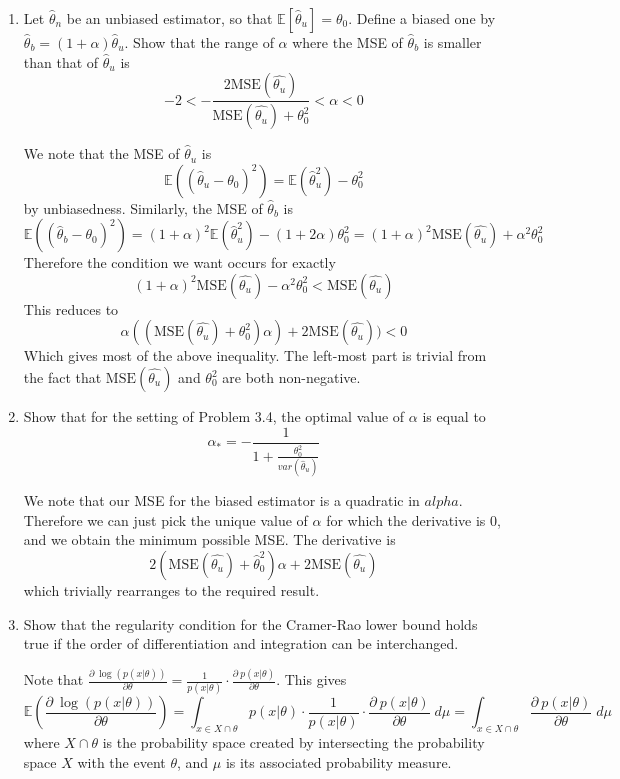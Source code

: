 \documentclass{article}
\newcommand{\chapternumber}{3}
\newenvironment{QandA}{\begin{enumerate}[label=\chapternumber.\arabic*]\bfseries\boldmath}
	{\end{enumerate}}
\newenvironment{answered}{\par\bigskip\normalfont\unboldmath}{}
\begin{document}
\begin{QandA}
		\item Let $\hat{\theta}_n$ be an unbiased estimator, so that $\mathbb{E}[\hat{\theta}_u]=\theta_0$. Define a biased one by $\hat{\theta}_b=(1+\alpha)\hat{\theta}_u$. Show that the range of $\alpha$ where the MSE of $\hat{\theta}_b$ is smaller than that of $\hat{\theta}_u$ is
		\[-2<-\frac{2\text{MSE}(\hat{\theta_u})}{\text{MSE}(\hat{\theta_u})+\theta_0^2}<\alpha<0\]
		\begin{answered}
			We note that the MSE of $\hat{\theta}_u$ is 
			\[\mathbb{E}((\hat{\theta}_u-\theta_0)^2)=\mathbb{E}(\hat{\theta}_u^2)-\theta_0^2\]
			by unbiasedness. Similarly, the MSE of $\hat{\theta}_b$ is
			\[\mathbb{E}((\hat{\theta}_b-\theta_0)^2)=(1+\alpha)^2\mathbb{E}(\hat{\theta}_u^2)-(1+2\alpha)\theta_0^2=(1+\alpha)^2\text{MSE}(\hat{\theta_u})+\alpha^2\theta_0^2\]
			Therefore the condition we want occurs for exactly
			\[(1+\alpha)^2\text{MSE}(\hat{\theta_u})-\alpha^2\theta_0^2<\text{MSE}(\hat{\theta_u})\]
			This reduces to
			\[\alpha((\text{MSE}(\hat{\theta_u})+\theta_0^2)\alpha)+2\text{MSE}(\hat{\theta_u}))<0\]
			Which gives most of the above inequality. The left-most part is trivial from the fact that $\text{MSE}(\hat{\theta_u})$ and $\theta_0^2$ are both non-negative.
		\end{answered}
	
		\item Show that for the setting of Problem 3.4, the optimal value of $\alpha$ is equal to 
		\[\alpha_*=-\frac{1}{1+\frac{\theta_0^2}{var(\hat{\theta}_u)}}\]
		\begin{answered}
			We note that our MSE for the biased estimator is a quadratic in $alpha$. Therefore we can just pick the unique value of $\alpha$ for which the derivative is 0, and we obtain the minimum possible MSE. The derivative is
			\[2(\text{MSE}(\hat{\theta_u})+\hat{\theta}_0^2)\alpha+2\text{MSE}(\hat{\theta_u})\]
			which trivially rearranges to the required result.
		\end{answered}
	
		\item Show that the regularity condition for the Cramer-Rao lower bound holds true if the order of differentiation and integration can be interchanged.
		\begin{answered}
			Note that $\frac{\partial\:\log (p(x|\theta))}{\partial \theta} = \frac{1}{p(x|\theta)}\cdot\frac{\partial\:p(x|\theta)}{\partial \theta}$. This gives \[\mathbb{E}\left(\frac{\partial\:\log (p(x|\theta))}{\partial \theta}\right)=\int_{x\in X\cap\theta} p(x|\theta)\cdot\frac{1}{p(x|\theta)}\cdot\frac{\partial\:p(x|\theta)}{\partial \theta}\;d\mu=\int_{x\in X\cap\theta}\frac{\partial\:p(x|\theta)}{\partial \theta}\;d\mu\]
			where $X\cap\theta$ is the probability space created by intersecting the probability space $X$ with the event $\theta$, and $\mu$ is its associated probability measure.
			

\end{answered}
\end{QandA}
\end{document}
